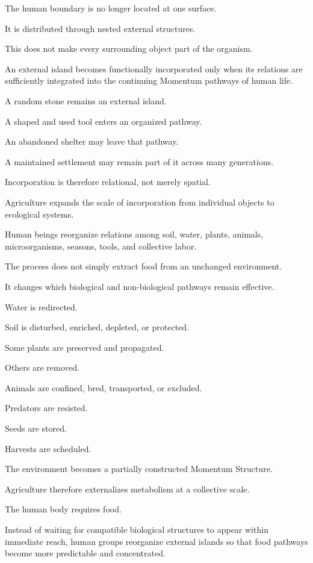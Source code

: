 The human boundary is no longer located at one surface.

It is distributed through nested external structures.

This does not make every surrounding object part of the organism.

An external island becomes functionally incorporated only when its relations are sufficiently integrated into the continuing Momentum pathways of human life.

A random stone remains an external island.

A shaped and used tool enters an organized pathway.

An abandoned shelter may leave that pathway.

A maintained settlement may remain part of it across many generations.

Incorporation is therefore relational, not merely spatial.

Agriculture expands the scale of incorporation from individual objects to ecological systems.

Human beings reorganize relations among soil, water, plants, animals, microorganisms, seasons, tools, and collective labor.

The process does not simply extract food from an unchanged environment.

It changes which biological and non-biological pathways remain effective.

Water is redirected.

Soil is disturbed, enriched, depleted, or protected.

Some plants are preserved and propagated.

Others are removed.

Animals are confined, bred, transported, or excluded.

Predators are resisted.

Seeds are stored.

Harvests are scheduled.

The environment becomes a partially constructed Momentum Structure.

Agriculture therefore externalizes metabolism at a collective scale.

The human body requires food.

Instead of waiting for compatible biological structures to appear within immediate reach, human groups reorganize external islands so that food pathways become more predictable and concentrated.

